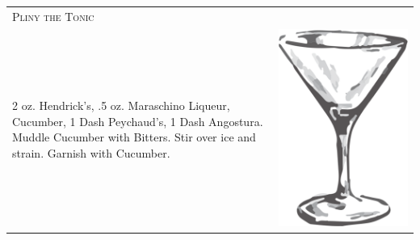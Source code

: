 \documentclass{article}
\begin{document}
\begin{tabular}{p{2in} p{0.5in}}
  \multicolumn{2}{p{3in}}{\centering\Huge\textsc{Pliny the Tonic}} \\ 
   \vspace{-0.1in}2 oz. Hendrick's, .5 oz. Maraschino Liqueur, Cucumber, 1 Dash Peychaud's, 1 Dash Angostura. Muddle Cucumber with Bitters. Stir over ice and strain. Garnish with Cucumber. &
   \vspace{-0.1in} \includegraphics{goblet.png}
\end{tabular}
\end{document}

